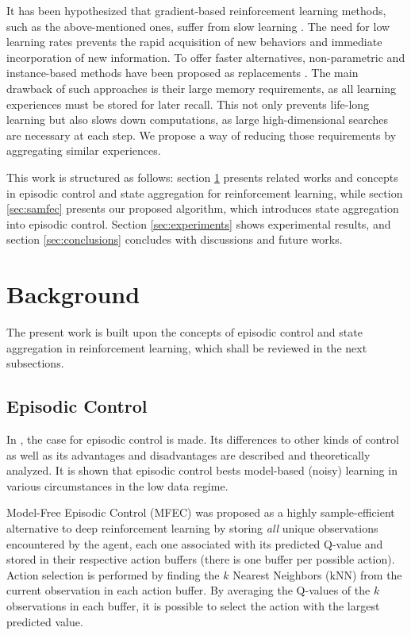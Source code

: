 \documentclass{article}
\begin{document}
It has been hypothesized that gradient-based reinforcement learning methods, such as the above-mentioned ones, suffer from slow learning \cite{botvinick2019reinforcement}. The need for low learning rates prevents the rapid acquisition of new behaviors and immediate incorporation of new information. To offer faster alternatives, non-parametric and instance-based methods have been proposed as replacements \cite{lengyel2008hippocampal, blundell2016model, gershman2017reinforcement, pritzel2017neural}. The main drawback of such approaches is their large memory requirements, as all learning experiences must be stored for later recall. This not only prevents life-long learning but also slows down computations, as large high-dimensional searches are necessary at each step. We propose a way of reducing those requirements by aggregating similar experiences.

This work is structured as follows: section \ref{sec:background} presents related works and concepts in episodic control and state aggregation for reinforcement learning, while section \ref{sec:samfec} presents our proposed algorithm, which introduces state aggregation into episodic control. Section \ref{sec:experiments} shows experimental results, and section \ref{sec:conclusions} concludes with discussions and future works.

\section{Background}
\label{sec:background}

The present work is built upon the concepts of episodic control and state aggregation in reinforcement learning, which shall be reviewed in the next subsections.

\subsection{Episodic Control}

In \cite{lengyel2008hippocampal}, the case for episodic control is made. Its differences to other kinds of control as well as its advantages and disadvantages are described and theoretically analyzed. It is shown that episodic control bests model-based (noisy) learning in various circumstances in the low data regime.

Model-Free Episodic Control (MFEC) \cite{blundell2016model} was proposed as a highly sample-efficient alternative to deep reinforcement learning \cite{mnih2013playing} by storing \emph{all} unique observations encountered by the agent, each one associated with its predicted Q-value and stored in their respective action buffers (there is one buffer per possible action). Action selection is performed by finding the $k$ Nearest Neighbors (kNN) from the current observation in each action buffer. By averaging the Q-values of the $k$ observations in each buffer, it is possible to select the action with the largest predicted value.
\end{document}
